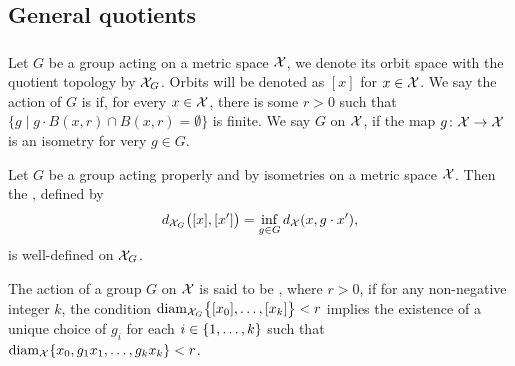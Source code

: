 
\subsection{General quotients}

\subsubsection{}


Let $G$ be a group acting on a metric space $\cX$, we denote its orbit space with the quotient topology by $\cX_G$.
Orbits will be denoted as $[x]$ for $x \in \cX$.
We say the action of $G$ is  if, for every $x \in \cX$, there is some $r>0$ such that $\{g \mid g\cdot B(x,r) \cap B(x,r) = \emptyset\}$ is finite.
We say $G$  on $\cX$, if the map $g \colon \cX \to \cX$ is an isometry for very $g \in G$.

Let $G$ be a group acting properly and by isometries on a metric space $\cX$.
Then the , defined by
\[
d_{\cX_G}\big([x], [x']\big) = \inf_{g \in G} d_\cX(x, g \cdot x'),
\]
is well-defined on $\cX_G$.

The action of a group $G$ on $\cX$ is said to be , where $r > 0$, if for any non-negative integer $k$, the condition $\diam_{\cX_G}\set[\big]{[x_0],\dots,[x_k]} < r$ implies the existence of a unique choice of $g_i$ for each $i \in \set{1,\dots,k}$ such that $\diam_{\cX}\set{x_0, g_1x_1, \dots, g_kx_k} < r$.

\subsubsection{}\label{subsub:h}

